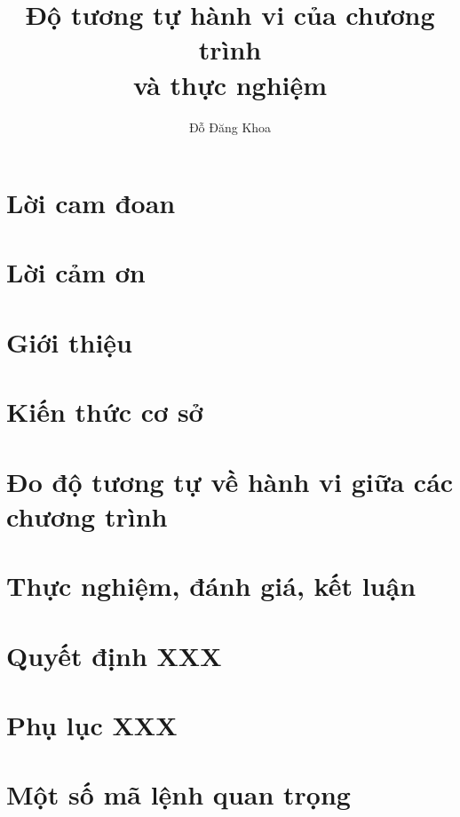 \documentclass[a4paper,oneside,openright]{memoir}
\title{Độ tương tự hành vi của chương trình \\và thực nghiệm}
\author{Đỗ Đăng Khoa}
\begin{document}




\chapter*{Lời cam đoan}


\chapter*{Lời cảm ơn}




\newpage
\tableofcontents




\chapter{Giới thiệu}


\chapter{Kiến thức cơ sở}


\chapter{Đo độ tương tự về hành vi giữa các chương trình}


\chapter{Thực nghiệm, đánh giá, kết luận}




\nocite{*} %


\appendix

\chapter{Quyết định XXX}

%

\chapter{Phụ lục XXX}


\chapter{Một số mã lệnh quan trọng}

\end{document}
